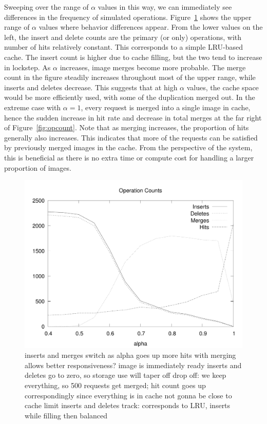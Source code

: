 \documentclass[sigconf]{acmart}
\begin{document}

Sweeping over the range of $\alpha$ values in this way,
we can immediately see differences in the frequency of simulated operations.
Figure~\ref{fig:opcounts} shows the upper range of $\alpha$ values where behavior differences appear.
From the lower values on the left,
the insert and delete counts are the primary (or only) operations,
with number of hits relatively constant.
This corresponds to a simple LRU-based cache.
The insert count is higher due to cache filling,
but the two tend to increase in lockstep.
As $\alpha$ increases,
image merges become more probable.
The merge count in the figure steadily increases throughout most of the upper range,
while inserts and deletes decrease.
This suggests that at high $\alpha$ values,
the cache space would be more efficiently used,
with some of the duplication merged out.
In the extreme case with $\alpha=1$,
every request is merged into a single image in cache,
hence the sudden increase in hit rate and decrease in total merges at the far right of Figure~\ref{fig:opcount}.
Note that as merging increases,
the proportion of hits generally also increases.
This indicates that more of the requests can be satisfied by previously merged images in the cache.
From the perspective of the system,
this is beneficial as there is no extra time or compute cost for handling a larger proportion of images.

\begin{figure}
\includegraphics[width=\linewidth]{curated/comparative/operation_count.pdf}
\label{fig:opcounts}
inserts and merges switch as alpha goes up
more hits with merging
allows better responsiveness? image is immediately ready
inserts and deletes go to zero, so storage use will taper off
drop off: we keep everything, so 500 requests get merged; hit count goes up correspondingly since everything is in cache
not gonna be close to cache limit
inserts and deletes track: corresponds to LRU, inserts while filling then balanced
\fi
\end{figure}
\end{document}
